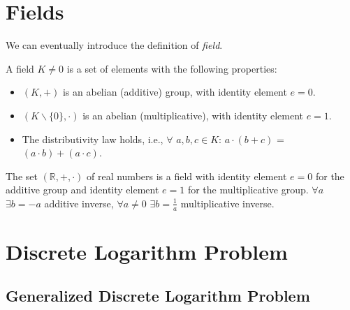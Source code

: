 \section{Fields}
We can eventually introduce the definition of \textit{field}.
\begin{mydef}
    A field $K\neq0$ is a set of elements with the following properties:
    \begin{itemize}
        \item $(K,+)$ is an abelian (additive) group, with identity element $e=0$.
        \item $(K\backslash\{0\},\cdot)$ is an abelian (multiplicative), with identity element $e=1$.
        \item The distributivity law holds, i.e., $\forall$ $a,b,c \in K$: $a \cdot (b+c)$ = $(a\cdot b) + (a\cdot c)$.
    \end{itemize}
\end{mydef}
\begin{myexample}
    The set $(\mathbb{R},+,\cdot)$ of real numbers is a field with identity element $e=0$ for the additive group and identity element $e=1$ for the multiplicative group. $\forall a$ $\exists b = -a$ additive inverse, $\forall a\neq 0$ $\exists b =\frac{1}{a}$ multiplicative inverse.
\end{myexample}
\begin{myexample}
    
\end{myexample}
\section{Discrete Logarithm Problem}
\subsection{Generalized Discrete Logarithm Problem}